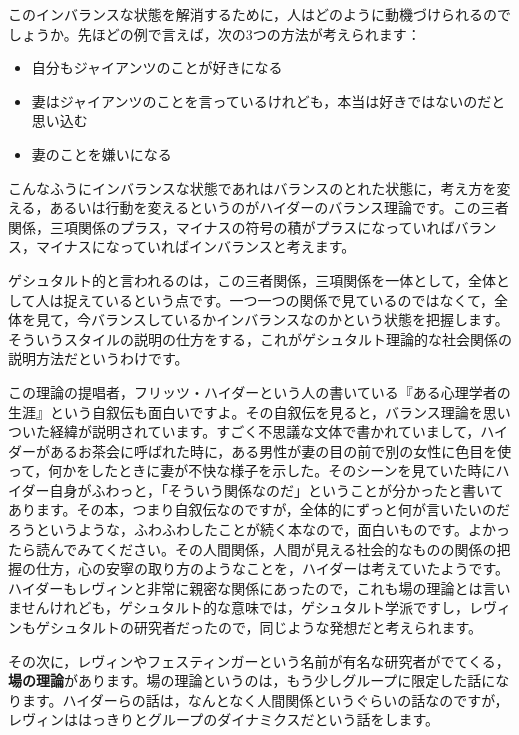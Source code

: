 \documentclass{ltjsbook}
\begin{document}
このインバランスな状態を解消するために，人はどのように動機づけられるのでしょうか。先ほどの例で言えば，次の3つの方法が考えられます：
\begin{itemize}
    \item 自分もジャイアンツのことが好きになる
    \item 妻はジャイアンツのことを言っているけれども，本当は好きではないのだと思い込む
    \item 妻のことを嫌いになる
\end{itemize}

こんなふうにインバランスな状態であれはバランスのとれた状態に，考え方を変える，あるいは行動を変えるというのがハイダーのバランス理論です。この三者関係，三項関係のプラス，マイナスの符号の積がプラスになっていればバランス，マイナスになっていればインバランスと考えます。

ゲシュタルト的と言われるのは，この三者関係，三項関係を一体として，全体として人は捉えているという点です。一つ一つの関係で見ているのではなくて，全体を見て，今バランスしているかインバランスなのかという状態を把握します。そういうスタイルの説明の仕方をする，これがゲシュタルト理論的な社会関係の説明方法だというわけです。

この理論の提唱者，フリッツ・ハイダーという人の書いている『ある心理学者の生涯』という自叙伝\parencite{HeiderDiary}も面白いですよ。その自叙伝を見ると，バランス理論を思いついた経緯が説明されています。すごく不思議な文体で書かれていまして，ハイダーがあるお茶会に呼ばれた時に，ある男性が妻の目の前で別の女性に色目を使って，何かをしたときに妻が不快な様子を示した。そのシーンを見ていた時にハイダー自身がふわっと，「そういう関係なのだ」ということが分かったと書いてあります。その本，つまり自叙伝なのですが，全体的にずっと何が言いたいのだろうというような，ふわふわしたことが続く本なので，面白いものです。よかったら読んでみてください。その人間関係，人間が見える社会的なものの関係の把握の仕方，心の安寧の取り方のようなことを，ハイダーは考えていたようです。ハイダーもレヴィンと非常に親密な関係にあったので，これも場の理論とは言いませんけれども，ゲシュタルト的な意味では，ゲシュタルト学派ですし，レヴィンもゲシュタルトの研究者だったので，同じような発想だと考えられます。

その次に，レヴィンやフェスティンガーという名前が有名な研究者がでてくる，\textbf{場の理論}があります。場の理論というのは，もう少しグループに限定した話になります。ハイダーらの話は，なんとなく人間関係というぐらいの話なのですが，レヴィンははっきりとグループのダイナミクスだという話をします。
\end{document}
